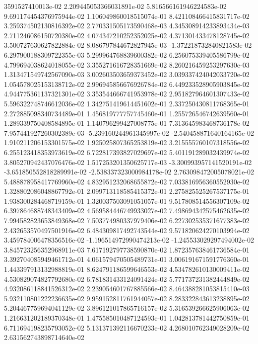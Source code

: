 3591527410013e-02	2.209445053366031891e-02	5.816566161946224583e-02	9.691174454376975944e-02	1.106049860018515074e-01	8.421108466415831717e-02	3.259374502130816392e-02	2.770331505173590468e-03	4.345308914233893434e-03	2.711246086150720380e-02	4.074347210252352025e-02	4.371301433478128745e-02	3.500727630627822884e-02	8.086797844672827945e-03	-1.372218732840821583e-02	6.297900188309722355e-03	5.299964768839600382e-02	6.256075339405586799e-02	4.799694038624018055e-02	3.355271616728351669e-02	8.260216459253297630e-03	1.313471549742567090e-03	3.002603503659373452e-02	3.039337424042033720e-02	1.054578025153138712e-02	2.996945856676926784e-02	6.449233528905903845e-02	4.944775361137321301e-02	3.353544666741953978e-02	2.951827964601307433e-02	5.596322748746612036e-02	1.342751419614451602e-01	2.337250430811768365e-01	2.272885098340734489e-01	1.456819777757745460e-01	1.255726546742639560e-01	1.289339750408584895e-01	1.140796299427008775e-01	7.313645983468736178e-02	7.957441927260302389e-03	-5.239160244961345997e-02	-2.540458871640164165e-02	1.910211206153301575e-02	1.925025807365253819e-02	3.215555760107318556e-02	6.255123418353973619e-02	6.722817393827029697e-02	5.401191289032439974e-02	3.805270942437076476e-02	1.517253201350625717e-03	-3.300993957141520191e-02	-3.651850552818289991e-02	-2.538337323000984178e-02	2.763098472005078021e-02	5.488878958417769960e-02	4.832951232068655872e-02	7.033816956360552930e-02	1.328802086048867792e-01	2.099713118585415372e-01	2.275825525267537175e-01	1.938300284468719159e-01	1.320037503091051057e-01	9.517808514556307109e-02	6.397864688748343409e-02	4.569584446749933027e-02	7.498694342575462635e-02	7.994582823653849368e-02	7.503774980337979406e-02	6.227302535371677383e-02	2.432653570497501916e-02	6.484309817492743544e-02	9.571820624270103994e-02	3.459784006478356516e-02	-1.196514972990474213e-02	-1.245533029297494002e-02	3.845723256352968911e-03	7.617192797738590870e-02	1.872357638461736584e-01	3.392704085949461712e-01	4.061579470505489731e-01	3.006191671591776360e-01	1.443397913132988819e-01	8.624791186599646553e-02	4.534782610130009411e-02	4.530829074827792680e-02	6.781831433124091424e-02	5.771737231382444849e-02	4.932086118841526312e-02	2.239054601767885566e-02	8.464388281053815410e-03	5.932110801222236635e-02	9.959152811761944057e-02	8.283322843613238895e-02	5.204467759694041129e-02	3.896121017865716157e-02	5.316539266625906063e-02	1.216631202189370348e-01	1.475585010487124593e-01	1.042813781442750859e-01	6.711694198235793052e-02	5.131371392116670233e-02	4.268010762349028209e-02	2.631562743898714640e-02
